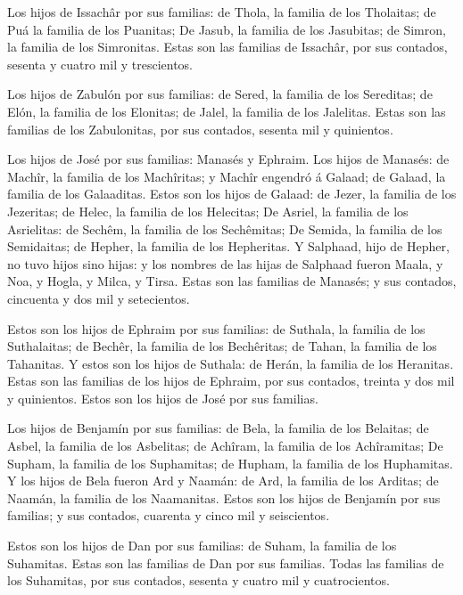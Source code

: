  Los hijos de Issachâr por sus familias: de Thola, la
familia de los Tholaitas; de Puá la familia de los Puanitas;
 De Jasub, la familia de los Jasubitas; de Simron, la
familia de los Simronitas.  Estas son las familias de
Issachâr, por sus contados, sesenta y cuatro mil y trescientos.

 Los hijos de Zabulón por sus familias: de Sered, la
familia de los Sereditas; de Elón, la familia de los Elonitas; de Jalel,
la familia de los Jalelitas.  Estas son las familias de los
Zabulonitas, por sus contados, sesenta mil y quinientos.

 Los hijos de José por sus familias: Manasés y Ephraim.
 Los hijos de Manasés: de Machîr, la familia de los
Machîritas; y Machîr engendró á Galaad; de Galaad, la familia de los
Galaaditas.  Estos son los hijos de Galaad: de Jezer, la
familia de los Jezeritas; de Helec, la familia de los Helecitas;
 De Asriel, la familia de los Asrielitas: de Sechêm, la
familia de los Sechêmitas;  De Semida, la familia de los
Semidaitas; de Hepher, la familia de los Hepheritas.  Y
Salphaad, hijo de Hepher, no tuvo hijos sino hijas: y los nombres de las
hijas de Salphaad fueron Maala, y Noa, y Hogla, y Milca, y Tirsa.
 Estas son las familias de Manasés; y sus contados,
cincuenta y dos mil y setecientos.

 Estos son los hijos de Ephraim por sus familias: de
Suthala, la familia de los Suthalaitas; de Bechêr, la familia de los
Bechêritas; de Tahan, la familia de los Tahanitas.  Y estos
son los hijos de Suthala: de Herán, la familia de los Heranitas.
 Estas son las familias de los hijos de Ephraim, por sus
contados, treinta y dos mil y quinientos. Estos son los hijos de José
por sus familias.

 Los hijos de Benjamín por sus familias: de Bela, la
familia de los Belaitas; de Asbel, la familia de los Asbelitas; de
Achîram, la familia de los Achîramitas;  De Supham, la
familia de los Suphamitas; de Hupham, la familia de los Huphamitas.
 Y los hijos de Bela fueron Ard y Naamán: de Ard, la
familia de los Arditas; de Naamán, la familia de los Naamanitas.
 Estos son los hijos de Benjamín por sus familias; y sus
contados, cuarenta y cinco mil y seiscientos.

 Estos son los hijos de Dan por sus familias: de Suham, la
familia de los Suhamitas. Estas son las familias de Dan por sus
familias.  Todas las familias de los Suhamitas, por sus
contados, sesenta y cuatro mil y cuatrocientos.

